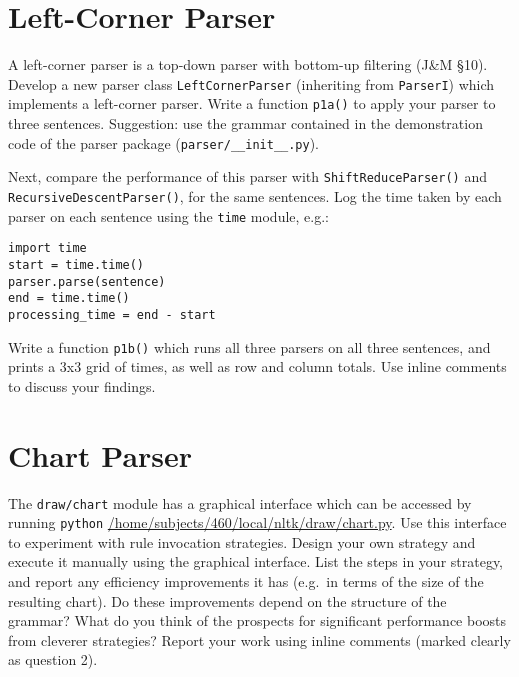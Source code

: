 \documentclass{460}
\begin{document}
\maketitle

\section{Left-Corner Parser}

A left-corner parser is a top-down parser with bottom-up filtering
(J\&M \S 10).  Develop a new parser class \texttt{LeftCornerParser}
(inheriting from
\texttt{ParserI}) which implements a left-corner parser.  Write a
function \texttt{p1a()} to apply your parser to three sentences.
Suggestion: use the grammar contained in the demonstration code
of the parser package (\texttt{parser/\_\_init\_\_.py}).

Next, compare the performance of this parser with
\texttt{ShiftReduceParser()} and \texttt{RecursiveDescentParser()},
for the same sentences.  Log the time taken by each parser on
each sentence using the \texttt{time} module, e.g.:

\begin{verbatim}
import time
start = time.time()
parser.parse(sentence)
end = time.time()
processing_time = end - start
\end{verbatim}

Write a function \texttt{p1b()} which runs all three parsers on all
three sentences, and prints a 3x3 grid of times, as well as row and
column totals.  Use inline comments to discuss your findings.

\section{Chart Parser}

The \texttt{draw/chart} module has a graphical interface which can be
accessed by running \texttt{python} \url{/home/subjects/460/local/nltk/draw/chart.py}.
Use this interface to experiment with rule invocation
strategies.  Design your own strategy and execute it
manually using the graphical interface.  List the steps in your
strategy, and report any efficiency improvements it has (e.g.~in terms
of the size of the resulting chart).  Do these improvements depend on
the structure of the grammar?  What do you think of the prospects for
significant performance boosts from cleverer strategies?  Report your
work using inline comments (marked clearly as question 2).

\pagebreak
\end{document}
